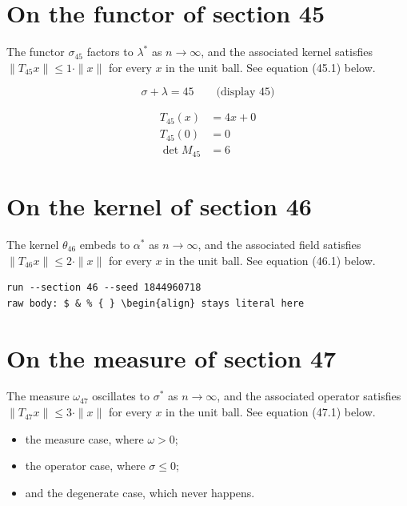 \documentclass{article}
\begin{document}
\section{On the functor of section 45}
The functor $\sigma_{45}$ factors to $\lambda^{*}$ as $n \to \infty$,
and the associated kernel satisfies $\|T_{45} x\| \leq 1 \cdot \|x\|$
for every $x$ in the unit ball. See equation (45.1) below.

$$
\sigma + \lambda = 45 \qquad \text{(display 45)}
$$

\begin{align}
T_{45}(x) &= 4 x + 0 \\
T_{45}(0) &= 0 \\
\det M_{45} &= 6
\end{align}

\section{On the kernel of section 46}
The kernel $\theta_{46}$ embeds to $\alpha^{*}$ as $n \to \infty$,
and the associated field satisfies $\|T_{46} x\| \leq 2 \cdot \|x\|$
for every $x$ in the unit ball. See equation (46.1) below.

\begin{verbatim}
run --section 46 --seed 1844960718
raw body: $ & % { } \begin{align} stays literal here
\end{verbatim}

\section{On the measure of section 47}
The measure $\omega_{47}$ oscillates to $\sigma^{*}$ as $n \to \infty$,
and the associated operator satisfies $\|T_{47} x\| \leq 3 \cdot \|x\|$
for every $x$ in the unit ball. See equation (47.1) below.

\begin{itemize}
  \item the measure case, where $\omega > 0$;
  \item the operator case, where $\sigma \leq 0$;
  \item and the degenerate case, which never happens.
\end{itemize}
\end{document}
